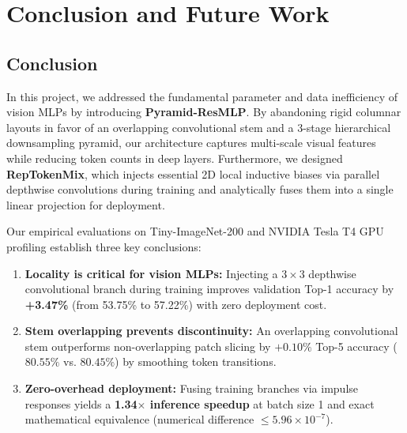 \section{Conclusion and Future Work}
\label{section:conclusion_and_future_work}

\subsection{Conclusion}
\label{subsection:conclusion}
In this project, we addressed the fundamental parameter and data inefficiency of vision MLPs by introducing \textbf{Pyramid-ResMLP}. By abandoning rigid columnar layouts in favor of an overlapping convolutional stem and a 3-stage hierarchical downsampling pyramid, our architecture captures multi-scale visual features while reducing token counts in deep layers. Furthermore, we designed \textbf{RepTokenMix}, which injects essential 2D local inductive biases via parallel depthwise convolutions during training and analytically fuses them into a single linear projection for deployment.

Our empirical evaluations on Tiny-ImageNet-200 and NVIDIA Tesla T4 GPU profiling establish three key conclusions:
\begin{enumerate}
    \item \textbf{Locality is critical for vision MLPs:} Injecting a $3 \times 3$ depthwise convolutional branch during training improves validation Top-1 accuracy by \textbf{+3.47\%} (from 53.75\% to 57.22\%) with zero deployment cost.
    \item \textbf{Stem overlapping prevents discontinuity:} An overlapping convolutional stem outperforms non-overlapping patch slicing by $+0.10\%$ Top-5 accuracy ($80.55\%$ vs. $80.45\%$) by smoothing token transitions.
    \item \textbf{Zero-overhead deployment:} Fusing training branches via impulse responses yields a \textbf{1.34$\times$ inference speedup} at batch size 1 and exact mathematical equivalence (numerical difference $\le 5.96 \times 10^{-7}$).
\end{enumerate}

